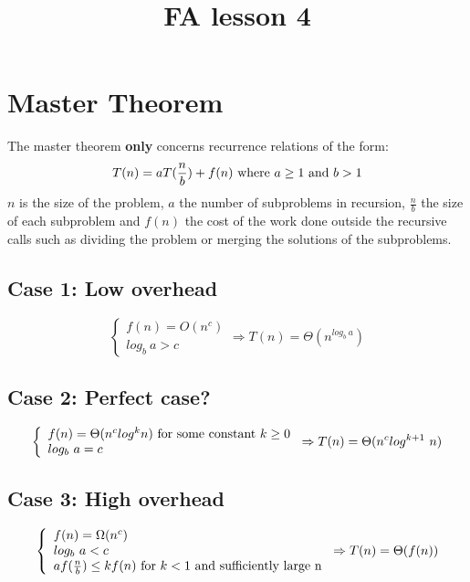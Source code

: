 \documentclass{article}
\title{FA lesson 4}
\begin{document}
\maketitle

\section{Master Theorem}
The master theorem \textbf{only} concerns recurrence relations of the form:
\begin{equation}T(n)=aT(\frac{n}{b}) + f(n) \textnormal{ where } a \geq 1 \textnormal{ and } b > 1\end{equation}
\newline $n$ is the size of the problem, $a$ the number of subproblems in recursion, 
$\frac{n}{b}$ the size of each subproblem and $f(n)$ the cost of the work done outside the recursive calls
such as dividing the problem or merging the solutions of the subproblems.

\subsection{Case 1: Low overhead}
\begin{equation}
\left\{
    \begin{array}{ll}
        f(n)=O(n^c) \\
        log_b\ a > c
    \end{array}
\right. \Rightarrow T(n) = \Theta(n^{log_b\ a})
\end{equation}
 
\subsection{Case 2: Perfect case?}
\begin{equation}
\left\{
    \begin{array}{ll}
        f(n)=\Theta(n^{c}log^{k}n) \textnormal{ for some constant } k \geq 0 \\
        log_b\ a = c
    \end{array}
\right. \Rightarrow T(n) = \Theta(n^{c}log^{k+1}\ n)
\end{equation}

\subsection{Case 3: High overhead}
\begin{equation}
\left\{
    \begin{array}{ll}
        f(n)=\Omega(n^c) \\
        log_b\ a < c \\
        af(\frac{n}{b}) \leq kf(n) \textnormal{ for } k < 1 \textnormal{ and sufficiently large n}
    \end{array}
\right. \Rightarrow T(n) = \Theta(f(n))
\end{equation}
\end{document}
